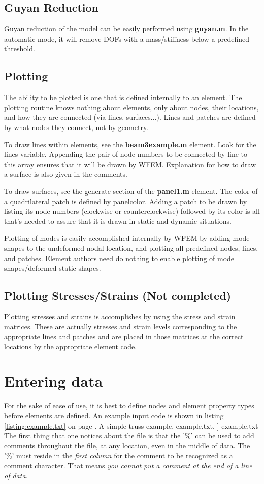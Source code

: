 \documentclass[12pt]{article}
\newcommand*{\command}[1]{\textsf{#1}}
\newcommand*{\filename}[1]{\textsf{\textbf{#1}}}
\newcommand{\includelisting}[2]{{\small\label{listing:#1}#2, #1. }]{ #1}}}
\begin{document}
\subsection{Guyan Reduction}
Guyan reduction of the model can be easily performed using
\filename{guyan.m}. In the automatic mode, it will remove DOFs with a
mass/stiffness below a predefined threshold.
\subsection{Plotting}
The ability to be plotted is one that is defined internally to an
element. The plotting routine knows
nothing about elements, only about nodes, their locations, and how
they are connected (via lines, surfaces...). Lines and patches are
defined by what nodes they connect, not by geometry. 

To draw lines within elements, see the \filename{beam3example.m} element. Look for the lines variable. Appending the pair of node numbers to be connected by line to this array ensures that it will be drawn by WFEM. Explanation for how to draw a surface is also given in the comments. 


To draw surfaces, see the generate section of the \filename{panel1.m} element. The color of a quadrilateral patch is defined by \command{panelcolor}. Adding a patch to be drawn by listing its node numbers (clockwise or counterclockwise) followed by its color is all that's needed to assure that it is drawn in static and dynamic situations. 

Plotting of modes
is easily accomplished internally by WFEM by adding mode shapes to the undeformed nodal
location, and plotting all predefined nodes, lines, and patches. Element authors need do nothing to enable plotting of mode shapes/deformed static shapes. 
\subsection{Plotting Stresses/Strains (Not completed)}
Plotting stresses and strains is accomplishes by using the
\command{stress} and \command{strain} matrices. These are actually
stresses and strain levels corresponding to the appropriate lines and
patches and are placed in those matrices at the correct locations by
the appropriate element code.
\section{Entering data}
For the sake of ease of use, it is best to define nodes and element property types before elements are defined. An example input code is shown in listing \ref{listing:example.txt} on page \pageref{example.txt}. 
%
\includelisting{example.txt}{A simple truss example\label{example.txt}}
The first thing that one notices about the file is that the '\%' can
be used to add comments throughout the file, at any location, even in
the middle of data. The '\%' must reside in the \emph{first column} for the
comment to be recognized as a comment character. That means \emph{you cannot put a comment at the end of a line of data.} 
\end{document}
